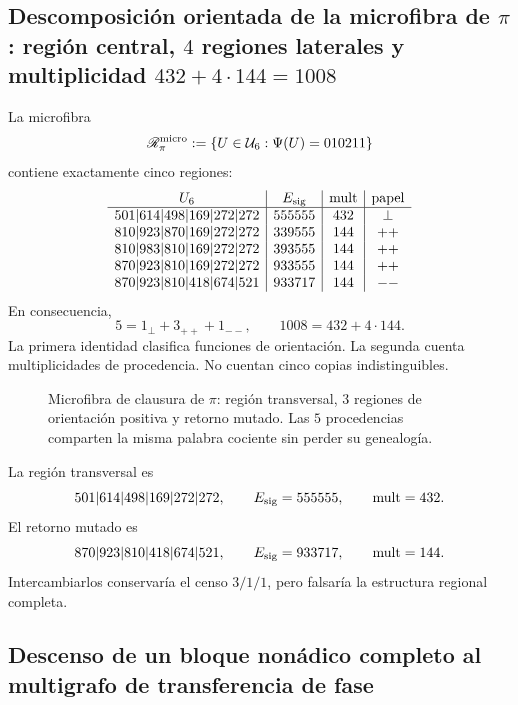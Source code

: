 \subsection{Descomposición orientada de la microfibra de \texorpdfstring{\(\pi\)}{pi}: región central, \(4\) regiones laterales y multiplicidad \texorpdfstring{\(432+4\cdot144=1008\)}{432+4x144=1008}}

La microfibra
\[
 \mathscr R_\pi^{\rm micro}
 :=\{U\in\mathcal U_6:\Psi(U)=010211\}
\]
contiene exactamente cinco regiones:
\[
\begin{array}{c|c|c|c}
U_6&E_{\rm sig}&\operatorname{mult}&\text{papel}\\ \hline
501|614|498|169|272|272&555555&432&\perp\\
810|923|870|169|272|272&339555&144&++\\
810|983|810|169|272|272&393555&144&++\\
870|923|810|169|272|272&933555&144&++\\
870|923|810|418|674|521&933717&144&--
\end{array}
\]
En consecuencia,
\begin{equation}
 \boxed{
 5=1_\perp+3_{++}+1_{--},
 \qquad
 1008=432+4\cdot144.}
 \label{p12-83-c8-s1:eq:descomposiciones-cinco-regiones-pi}
\end{equation}
La primera identidad clasifica funciones de orientación. La segunda cuenta
multiplicidades de procedencia. No cuentan cinco copias indistinguibles.

\begin{figure}[htbp]
\centering
\resizebox{\textwidth}{!}{}
\caption{Microfibra de clausura de \(\pi\): región transversal,
\(3\) regiones de orientación positiva y retorno mutado. Las \(5\)
procedencias comparten la misma palabra cociente sin perder su genealogía.}
\label{fig:cinco-regiones-pi-microfibra-canonica}
\end{figure}

La región transversal es
\[
 501|614|498|169|272|272,
 \qquad E_{\rm sig}=555555,
 \qquad\operatorname{mult}=432.
\]
El retorno mutado es
\[
 870|923|810|418|674|521,
 \qquad E_{\rm sig}=933717,
 \qquad\operatorname{mult}=144.
\]
Intercambiarlos conservaría el censo \(3/1/1\), pero falsaría la estructura
regional completa.

\subsection{Descenso de un bloque nonádico completo al multigrafo de transferencia de fase}

